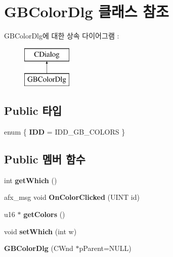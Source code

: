 \hypertarget{class_g_b_color_dlg}{}\section{G\+B\+Color\+Dlg 클래스 참조}
\label{class_g_b_color_dlg}
G\+B\+Color\+Dlg에 대한 상속 다이어그램 \+: \begin{figure}[H]
\begin{center}
\leavevmode
\includegraphics[height=2.000000cm]{class_g_b_color_dlg}
\end{center}
\end{figure}
\subsection*{Public 타입}
\begin{DoxyCompactItemize}
\item 
\mbox{\label{class_g_b_color_dlg_a0521b97d21035c132d3dba9bc818837a}} 
enum \{ {\bfseries I\+DD} = I\+D\+D\+\_\+\+G\+B\+\_\+\+C\+O\+L\+O\+RS
 \}
\end{DoxyCompactItemize}
\subsection*{Public 멤버 함수}
\begin{DoxyCompactItemize}
\item 
\mbox{\label{class_g_b_color_dlg_a8f4e8dbf15d1f2d1bab9df384ebf484e}} 
int {\bfseries get\+Which} ()
\item 
\mbox{\label{class_g_b_color_dlg_a244aa29f38fa1e813aca166ba63982c6}} 
afx\+\_\+msg void {\bfseries On\+Color\+Clicked} (U\+I\+NT id)
\item 
\mbox{\label{class_g_b_color_dlg_ab3fe3dff45003cb0483ad90eb42a3052}} 
u16 $\ast$ {\bfseries get\+Colors} ()
\item 
\mbox{\label{class_g_b_color_dlg_a1e00eaaeaf344a830f1dd5692e26af1d}} 
void {\bfseries set\+Which} (int w)
\item 
\mbox{\label{class_g_b_color_dlg_a57ebd7e910414cd9c33725faf038afcb}} 
{\bfseries G\+B\+Color\+Dlg} (C\+Wnd $\ast$p\+Parent=N\+U\+LL)
\end{DoxyCompactItemize}

